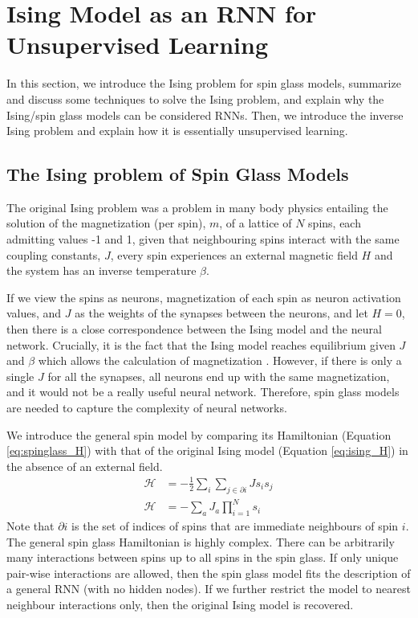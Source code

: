 \documentclass[%
 reprint,
 amsmath,amssymb,
 aps,
]{revtex4-2}
\begin{document}
\section{Ising Model as an RNN for Unsupervised Learning}
In this section, we introduce the Ising problem for spin glass models, summarize and discuss some techniques to solve the Ising problem, and explain why the Ising/spin glass models can be considered RNNs. Then, we introduce the inverse Ising problem and explain how it is essentially unsupervised learning. 

\subsection{The Ising problem of Spin Glass Models}
The original Ising problem \cite{yeomans1992statistical} was a problem in many body physics entailing the solution of the magnetization (per spin), $m$, of a lattice of $N$ spins, each admitting values -1 and 1, given that neighbouring spins interact with the same coupling constants, $J$, every spin experiences an external magnetic field $H$ and the system has an inverse temperature $\beta$.

If we view the spins as neurons, magnetization of each spin as neuron activation values, and $J$ as the weights of the synapses between the neurons, and let $H=0$, then there is a close correspondence between the Ising model and the neural network. Crucially, it is the fact that the Ising model reaches equilibrium given $J$ and $\beta$ which allows the calculation of magnetization \cite{schmidhuber2022annotated}. However, if there is only a single $J$ for all the synapses, all neurons end up with the same magnetization, and it would not be a really useful neural network. Therefore, spin glass models are needed to capture the complexity of neural networks. 

We introduce the general spin model \cite{huang2021statistical_cavity} by comparing its Hamiltonian (Equation \ref{eq:spinglass_H}) with that of the original Ising model (Equation \ref{eq:ising_H}) in the absence of an external field. 
\begin{align}
    \mathcal{H}&=-\frac{1}{2}\sum_i\sum_{j \in \partial i} J s_i s_j \label{eq:ising_H} \\
    \mathcal{H}&=-\sum_{a} J_{a} \prod_{i=1}^N s_i\label{eq:spinglass_H}
\end{align}
Note that $\partial i$ is the set of indices of spins that are immediate neighbours of spin $i$. 
The general spin glass Hamiltonian is highly complex. There can be arbitrarily many interactions between spins up to all spins in the spin glass. If only unique pair-wise interactions are allowed, then the spin glass model fits the description of a general RNN (with no hidden nodes). If we further restrict the model to nearest neighbour interactions only, then the original Ising model is recovered.
\end{document}
